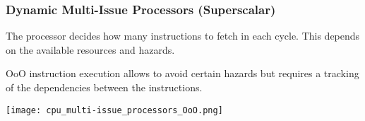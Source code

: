 \begin{multicols*}{2}
    \subsubsection{Dynamic Multi-Issue Processors (Superscalar)}
    The processor decides how many instructions to fetch in each cycle. This depends on the available resources and hazards.
    \newpar{}

    OoO instruction execution allows to avoid certain hazards but requires a tracking of the dependencies between the instructions.
    \begin{center}
        \texttt{[image: cpu\_multi-issue\_processors\_OoO.png]}
    \end{center}

\end{multicols*}